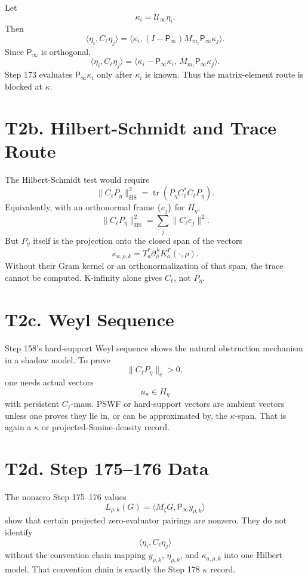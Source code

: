\documentclass[11pt]{article}
\newcommand{\Psym}{\mathsf P_\infty}
\newcommand{\Cell}{C_\ell}
\newcommand{\Peta}{P_\eta}
\begin{document}
Let
\[
\kappa_i=\mathcal U_\infty\eta_i.
\]
Then
\[
\langle \eta_i,\Cell\eta_j\rangle
=
\langle \kappa_i,(I-\Psym)M_{m_\ell}\Psym\kappa_j\rangle.
\]
Since \(\Psym\) is orthogonal,
\[
\boxed{
\langle \eta_i,\Cell\eta_j\rangle
=
\langle \kappa_i-\Psym\kappa_i,\,
M_{m_\ell}\Psym\kappa_j\rangle.
}
\]
Step 173 evaluates \(\Psym\kappa_i\) only after \(\kappa_i\) is known.  Thus
the matrix-element route is blocked at \(\kappa\).

\section{T2b. Hilbert-Schmidt and Trace Route}

The Hilbert-Schmidt test would require
\[
\|\Cell\Peta\|_{\mathrm{HS}}^2
=
\operatorname{tr}(\Peta \Cell^*\Cell \Peta).
\]
Equivalently, with an orthonormal frame \(\{e_j\}\) for \(H_\eta\),
\[
\|\Cell\Peta\|_{\mathrm{HS}}^2
=
\sum_j\|\Cell e_j\|^2.
\]
But \(\Peta\) itself is the projection onto the closed span of the vectors
\[
\kappa_{a,\rho,k}=T_a^*\partial_{\overline\rho}^{\,k}
K_a^\Gamma(\cdot,\rho).
\]
Without their Gram kernel or an orthonormalization of that span, the trace
cannot be computed.  K-infinity alone gives \(\Cell\), not \(\Peta\).

\section{T2c. Weyl Sequence}

Step 158's hard-support Weyl sequence shows the natural obstruction mechanism
in a shadow model.  To prove
\[
\|\Cell\Peta\|_{\mathrm e}>0,
\]
one needs actual vectors
\[
u_n\in H_\eta
\]
with persistent \(\Cell\)-mass.  PSWF or hard-support vectors are ambient
vectors unless one proves they lie in, or can be approximated by, the
\(\kappa\)-span.  That is again a \(\kappa\) or projected-Sonine-density
record.

\section{T2d. Step 175--176 Data}

The nonzero Step 175--176 values
\[
L_{\rho,k}(G)=\langle M_\zeta G,\Psym y_{\rho,k}\rangle
\]
show that certain projected zero-evaluator pairings are nonzero.  They do not
identify
\[
\langle \eta_i,\Cell\eta_j\rangle
\]
without the convention chain mapping \(y_{\rho,k}\), \(\eta_{\rho,k}\), and
\(\kappa_{a,\rho,k}\) into one Hilbert model.  That convention chain is exactly
the Step 178 \(\kappa\) record.
\end{document}
